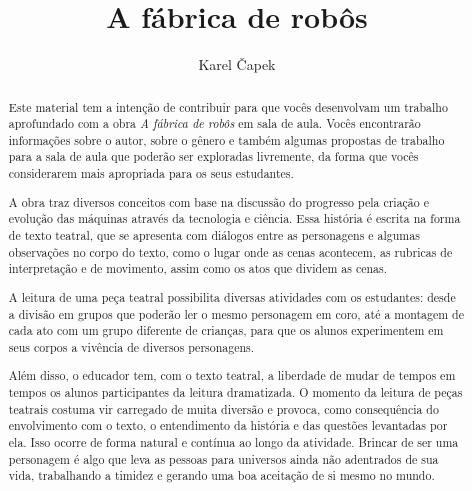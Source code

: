 \documentclass[11pt]{extarticle}
\newcommand{\AutorLivro}{Karel Čapek}
\newcommand{\TituloLivro}{A fábrica de robôs}
\newcommand{\colaborador}{Gabriela Karam}
\begin{document}
\title{\TituloLivro}
\author{\AutorLivro}
\def\authornotes{\colaborador}

\date{}
\maketitle


\tableofcontents


\begin{abstract}

Este material tem a intenção de contribuir para que vocês desenvolvam um trabalho aprofundado com a obra \textit{A fábrica de robôs} em sala de aula.
Vocês encontrarão informações sobre o autor, sobre o gênero e também 
algumas propostas de trabalho para a sala de aula que poderão ser exploradas livremente, 
da forma que vocês considerarem mais apropriada para os seus estudantes.

A obra traz diversos conceitos com base na discussão do progresso pela criação e evolução das máquinas através da tecnologia e ciência. Essa história é escrita na forma de texto teatral, que se apresenta com diálogos entre as personagens e algumas observações no corpo do texto, como o lugar onde as cenas acontecem, as rubricas de interpretação e de movimento, assim como os atos que dividem as cenas. 

A leitura de uma peça teatral possibilita diversas atividades com os estudantes: desde a divisão em grupos que poderão ler o mesmo personagem em coro, até a montagem de cada ato com um grupo diferente de crianças, para que os alunos experimentem em seus corpos a vivência de diversos personagens. 

Além disso, o educador tem, com o texto teatral, a liberdade de mudar de tempos em tempos os alunos participantes da leitura dramatizada. O momento da leitura de peças teatrais costuma vir carregado de muita diversão e provoca, como consequência do envolvimento com o texto, o entendimento da história e das questões levantadas por ela. Isso ocorre de forma natural e contínua ao longo da atividade. Brincar de ser uma personagem é algo que leva as pessoas para universos ainda não adentrados de sua vida, trabalhando a timidez e gerando uma boa aceitação de si mesmo no mundo.


\end{abstract}
\end{document}
